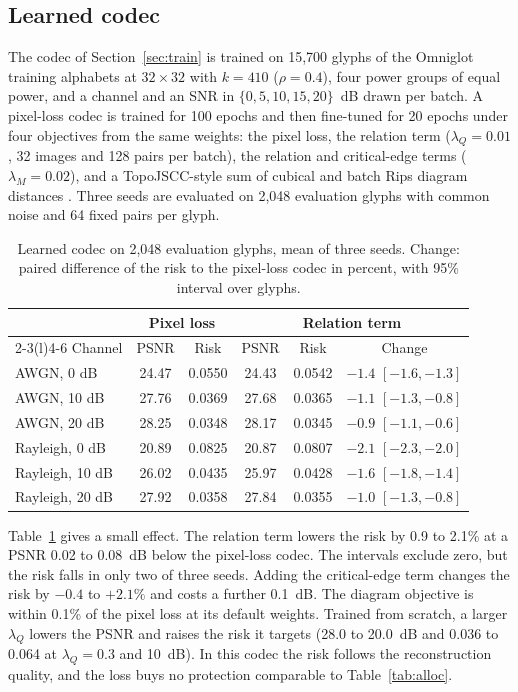 \documentclass[10pt,conference]{IEEEtran}
\begin{document}
\subsection{Learned codec}\label{sec:neural}
The codec of Section~\ref{sec:train} is trained on 15,700 glyphs of the Omniglot training alphabets at $32\times32$ with $k=410$ ($\rho=0.4$), four power groups of equal power, and a channel and an SNR in $\{0,5,10,15,20\}$~dB drawn per batch. A pixel-loss codec is trained for 100 epochs and then fine-tuned for 20 epochs under four objectives from the same weights: the pixel loss, the relation term ($\lambda_Q=0.01$, 32 images and 128 pairs per batch), the relation and critical-edge terms ($\lambda_M=0.02$), and a TopoJSCC-style sum of cubical and batch Rips diagram distances \cite{erak2026topojscc}. Three seeds are evaluated on 2,048 evaluation glyphs with common noise and 64 fixed pairs per glyph.
\begin{table}[t]\centering
\caption{Learned codec on 2,048 evaluation glyphs, mean of three seeds. Change: paired difference of the risk to the pixel-loss codec in percent, with 95\% interval over glyphs.}\label{tab:neural}
\setlength{\tabcolsep}{3pt}
\begin{tabular}{@{}lccccc@{}}\toprule
 & \multicolumn{2}{c}{Pixel loss} & \multicolumn{3}{c}{Relation term}\\\cmidrule(lr){2-3}\cmidrule(l){4-6}
Channel & PSNR & Risk & PSNR & Risk & Change\\\midrule
AWGN, 0 dB & 24.47 & 0.0550 & 24.43 & 0.0542 & $-1.4$ $[-1.6,-1.3]$\\
AWGN, 10 dB & 27.76 & 0.0369 & 27.68 & 0.0365 & $-1.1$ $[-1.3,-0.8]$\\
AWGN, 20 dB & 28.25 & 0.0348 & 28.17 & 0.0345 & $-0.9$ $[-1.1,-0.6]$\\
Rayleigh, 0 dB & 20.89 & 0.0825 & 20.87 & 0.0807 & $-2.1$ $[-2.3,-2.0]$\\
Rayleigh, 10 dB & 26.02 & 0.0435 & 25.97 & 0.0428 & $-1.6$ $[-1.8,-1.4]$\\
Rayleigh, 20 dB & 27.92 & 0.0358 & 27.84 & 0.0355 & $-1.0$ $[-1.3,-0.8]$\\\bottomrule
\end{tabular}\end{table}
Table~\ref{tab:neural} gives a small effect. The relation term lowers the risk by 0.9 to 2.1\% at a PSNR 0.02 to 0.08~dB below the pixel-loss codec. The intervals exclude zero, but the risk falls in only two of three seeds. Adding the critical-edge term changes the risk by $-0.4$ to $+2.1\%$ and costs a further 0.1~dB. The diagram objective is within 0.1\% of the pixel loss at its default weights. Trained from scratch, a larger $\lambda_Q$ lowers the PSNR and raises the risk it targets (28.0 to 20.0~dB and 0.036 to 0.064 at $\lambda_Q=0.3$ and 10~dB). In this codec the risk follows the reconstruction quality, and the loss buys no protection comparable to Table~\ref{tab:alloc}.
\end{document}
